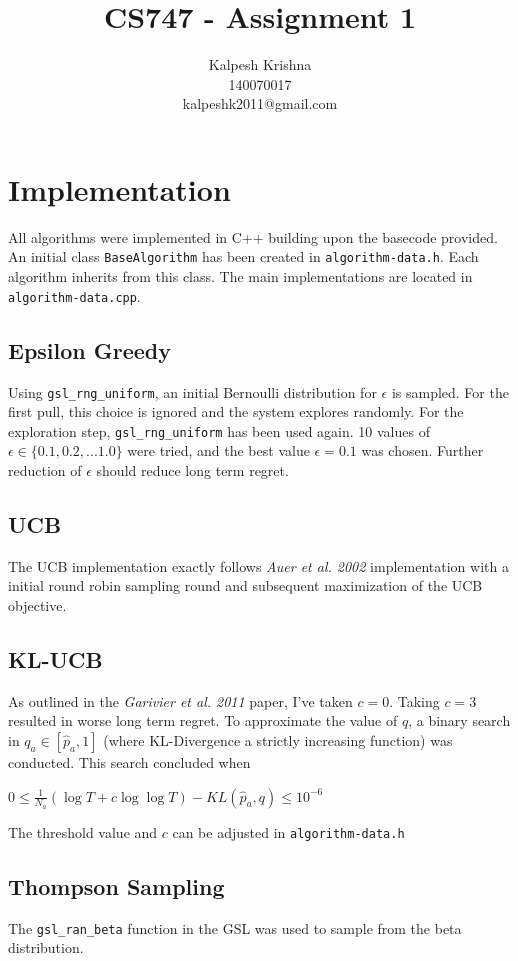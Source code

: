 \documentclass[11pt]{article}
\title{\textbf{CS747 - Assignment 1}}
\author{Kalpesh Krishna\\140070017\\kalpeshk2011@gmail.com}
\date{}
\begin{document}
\maketitle

\section{Implementation}
All algorithms were implemented in C++ building upon the basecode provided. An initial class \texttt{BaseAlgorithm} has been created in \texttt{algorithm-data.h}. Each algorithm inherits from this class. The main implementations are located in \texttt{algorithm-data.cpp}.
\subsection{Epsilon Greedy}
Using \texttt{gsl\_rng\_uniform}, an initial Bernoulli distribution for $\epsilon$ is sampled. For the first pull, this choice is ignored and the system explores randomly. For the exploration step, \texttt{gsl\_rng\_uniform} has been used again. 10 values of $\epsilon \in \{0.1, 0.2, ... 1.0\}$ were tried, and the best value $\epsilon = 0.1$ was chosen. Further reduction of $\epsilon$ should reduce long term regret.
\subsection{UCB}
The UCB implementation exactly follows \textit{Auer et al. 2002} implementation with a initial round robin sampling round and subsequent maximization of the UCB objective.
\subsection{KL-UCB}
As outlined in the \textit{Garivier et al. 2011} paper, I've taken $c=0$. Taking $c=3$ resulted in worse long term regret. To approximate the value of $q$, a binary search in $q_a \in [\hat{p}_a, 1]$ (where KL-Divergence a strictly increasing function) was conducted. This search concluded when
\begin{center}
$0 \leq \frac{1}{N_a}(\log{T} + c\log{\log{T}}) - KL(\hat{p}_a, q) \leq 10^{-6}$
\end{center}
The threshold value and $c$ can be adjusted in \texttt{algorithm-data.h}
\subsection{Thompson Sampling}
The \texttt{gsl\_ran\_beta} function in the GSL was used to sample from the beta distribution.
\end{document}
